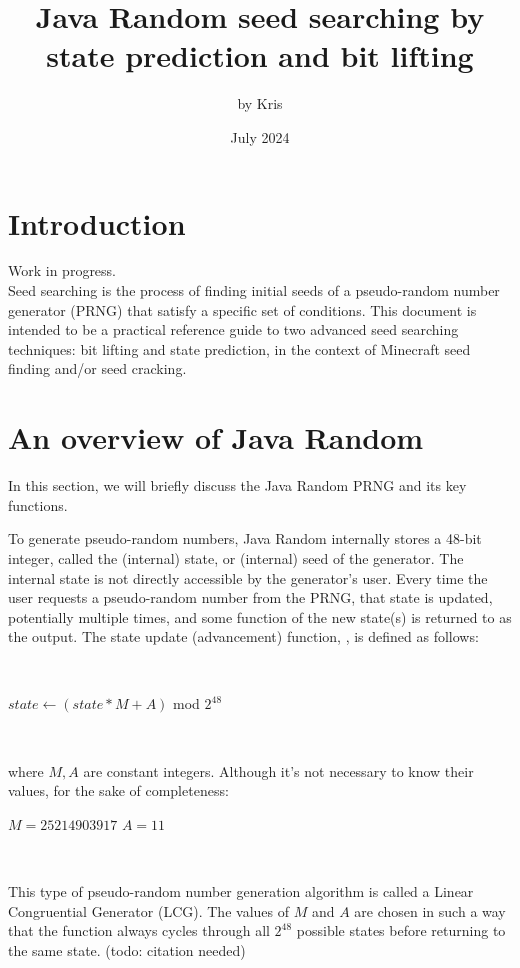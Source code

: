 \documentclass{article}
\title{Java Random seed searching by state prediction and bit lifting}
\author{by Kris}
\date{July 2024}
\begin{document}
\maketitle

\section{Introduction}
Work in progress.\\
Seed searching is the process of finding initial seeds of a pseudo-random number generator (PRNG) that satisfy a specific set of conditions.
This document is intended to be a practical reference guide to two advanced seed searching techniques: bit lifting and state prediction, in the context of Minecraft seed finding and/or seed cracking.

\section{An overview of Java Random}
In this section, we will briefly discuss the Java Random PRNG and its key functions.

To generate pseudo-random numbers, Java Random internally stores a 48-bit integer, called the (internal) state, or (internal) seed of the generator. The internal state is not directly accessible by the generator’s user. Every time the user requests a pseudo-random number from the PRNG, that state is updated, potentially multiple times, and some function of the new state(s) is returned to as the output. The state update (advancement) function, , is defined as follows:

\
\begin{algorithmic}
    \State $state \gets (state * M + A)$ mod $2^{48}$
\EndFunction
\end{algorithmic}
\ \

\noindent where $M, A$ are constant integers. Although it's not necessary to know their values, for the sake of completeness:
\begin{algorithmic}
    \State $M = 25214903917$
    \State $A = 11$
\end{algorithmic}
\ \

This type of pseudo-random number generation algorithm is called a Linear Congruential Generator (LCG). The values of $M$ and $A$ are chosen in such a way that the  function always cycles through all $2^{48}$ possible states before returning to the same state. (todo: citation needed)
\end{document}

